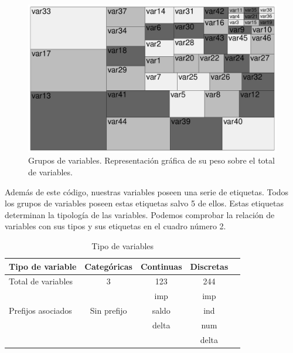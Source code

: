\documentclass[11pt,a4paper,spanish]{article} %
\begin{document}
\begin{figure}[h!]
	\begin{center}
	\includegraphics[width=\textwidth, height=\textheight,keepaspectratio]{Z_01_11_Treeplot.pdf}
	\caption{Grupos de variables. Representación gráfica de su peso sobre el total de variables.}
    \end{center}
\end{figure}

\newpage

Además de este código, nuestras variables poseen una serie de etiquetas. Todos los grupos de variables poseen estas etiquetas salvo 5 de ellos. Estas etiquetas determinan la tipología de las variables. Podemos comprobar la relación de variables con sus tipos y sus etiquetas en el cuadro número 2.

\vspace{1.5cm}

\begin{table}[htbp]
\begin{center}
\begin{tabular}{|l|c|c|c|c|} \hline 
\textbf{Tipo de variable} & \textbf{Categóricas}  & \textbf{Continuas} & \textbf{Discretas} \\  \hline
Total de variables  & 3           &  123    & 244   \\  \hline
                    &             &  imp    & imp   \\  
 Prefijos asociados & Sin prefijo &  saldo  & ind   \\
                    &             &  delta  & num   \\
                    &             &         & delta \\  \hline
\end{tabular}
\caption{Tipo de variables}
\end{center}
\end{table}
\end{document}
